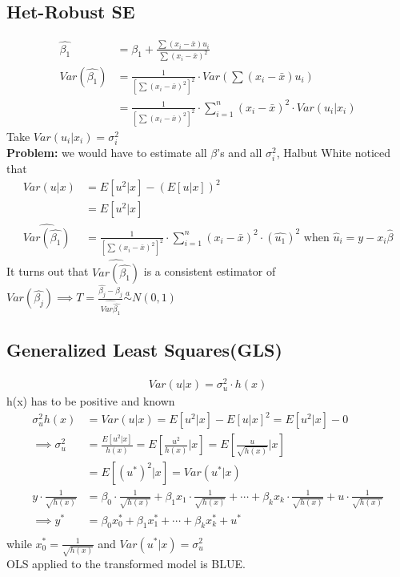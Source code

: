 \documentclass{article}
\theoremstyle{definition}
\theoremstyle{thrm}
\theoremstyle{lma}
\theoremstyle{ppst}
\theoremstyle{crlr}
\begin{document}
\subsection{Het-Robust SE}
\begin{align*}
	\hat{\beta_1} &= \beta_1+\frac{\sum(x_i-\bar{x})u_i}{\sum(x_i-\bar{x})^2}\\
	Var(\hat{\beta_1}) &= \frac{1}{[\sum(x_i-\bar{x})^2]^2}\cdot Var(\sum(x_i-\bar{x})u_i)\\
	&=\frac{1}{[\sum(x_i-\bar{x})^2]^2}\cdot \sum_{i=1}^n(x_i-\bar{x})^2 \cdot Var(u_i|x_i)
\end{align*}
Take $Var(u_i|x_i) = \sigma_i^2$\\
\textbf{Problem: } we would have to estimate all $\beta$'s and all $\sigma_i^2$, Halbut White noticed that
\begin{align*}
	Var(u|x) &= E[u^2|x]-(E[u|x])^2\\
	&=E[u^2|x]\\
	\widehat{Var({\hat{\beta_1}})} &= \frac{1}{[\sum(x_i-\bar{x})^2]^2}\cdot \sum_{i=1}^n(x_i-\bar{x})^2 \cdot (\hat{u_1})^2 \text{ when } \hat{u}_i = y-x_i\hat{\beta}
\end{align*}
It turns out that $\widehat{Var({\hat{\beta_1}})}$ is a consistent estimator of $Var(\hat{\beta_j})\implies T = \frac{\hat{\beta_j}-\beta_j}{\widehat{Var{\hat{\beta_1}}}}\stackrel{a}{\sim}N(0,1)$
\subsection{Generalized Least Squares(GLS)}
\begin{align*}
	Var(u|x) = \sigma_u^2\cdot h(x) 
\end{align*}
 h(x) has to be positive and known
\begin{align*}
	\sigma_u^2h(x)& = Var(u|x) = E[u^2|x]-E[u|x]^2 = E[u^2|x]-0\\
	\implies \sigma_u^2 &= \frac{E[u^2|x]}{h(x)} = E[\frac{u^2}{h(x)}|x] = E[\frac{u}{\sqrt{h(x)}}|x]\\
	&=E[(u^*)^2|x] = Var(u^*|x)\\
	y\cdot\frac{1}{\sqrt{h(x)}}&=\beta_0\cdot\frac{1}{\sqrt{h(x)}}+\beta_1x_1\cdot\frac{1}{\sqrt{h(x)}}+\cdots+\beta_kx_k\cdot\frac{1}{\sqrt{h(x)}}+u\cdot\frac{1}{\sqrt{h(x)}}\\
	\implies y^*&=\beta_0x_0^*+\beta_1x_1^*+\cdots+\beta_kx_k^*+u^*\\
\end{align*}
while $x_0^* = \frac{1}{\sqrt{h(x)}}$ and $Var(u^*|x) = \sigma_u^2$\\
OLS applied to the transformed model is BLUE.
\end{document}
